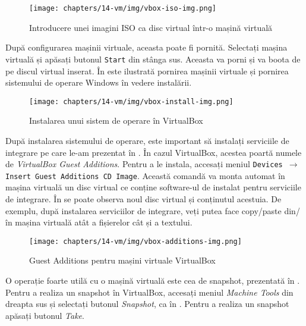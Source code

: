 \begin{figure}[!htbp]
  \centering
  \texttt{[image: chapters/14-vm/img/vbox-iso-img.png]}
  \caption{Introducere unei imagini ISO ca disc virtual într-o mașină virtuală}
  \label{fig:vm:vbox-iso}
\end{figure}

După configurarea mașinii virtuale, aceasta poate fi pornită.
Selectați mașina virtuală și apăsați butonul \texttt{Start} din stânga sus.
Aceasta va porni și va boota de pe discul virtual inserat.
În  este ilustrată pornirea mașinii virtuale și pornirea sistemului de operare Windows în vedere instalării.

\begin{figure}[!htbp]
  \centering
  \texttt{[image: chapters/14-vm/img/vbox-install-img.png]}
  \caption{Instalarea unui sistem de operare în VirtualBox}
  \label{fig:vm:vbox-install}
\end{figure}

După instalarea sistemului de operare, este important să instalați serviciile de integrare pe care le-am prezentat în .
 În cazul VirtualBox, acestea poartă numele de \textit{VirtualBox Guest Additions}.
Pentru a le instala, accesați meniul \texttt{Devices $\rightarrow$ Insert Guest Additions CD Image}.
Această comandă va monta automat în mașina virtuală un disc virtual ce conține software-ul de instalat pentru serviciile de integrare.
În  se poate observa noul disc virtual și conținutul acestuia.
De exemplu, după instalarea serviciilor de integrare, veți putea face copy/paste din/în mașina virtuală atât a fișierelor cât și a textului.

\begin{figure}[!htbp]
  \centering
  \texttt{[image: chapters/14-vm/img/vbox-additions-img.png]}
  \caption{Guest Additions pentru mașini virtuale VirtualBox}
  \label{fig:vm:vbox-additions}
\end{figure}

O operație foarte utilă cu o mașină virtuală este cea de snapshot, prezentată în .
Pentru a realiza un snapshot în VirtualBox, accesați meniul \textit{Machine Tools} din dreapta sus și selectați butonul \textit{Snapshot}, ca în .
Pentru a realiza un snapshot apăsați butonul \textit{Take}.

